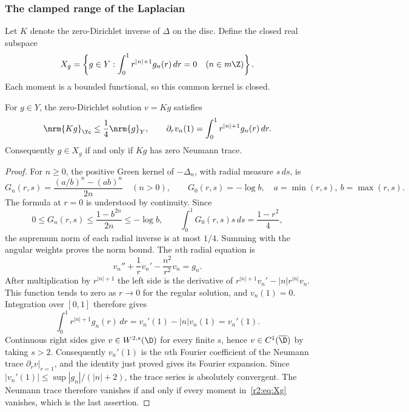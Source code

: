 \subsubsection{The clamped range of the Laplacian}
Let $K$ denote the zero-Dirichlet inverse of $\Delta$ on the disc. Define the closed real subspace
\begin{equation}\label{r2:eq:Xg}
 X_g=\left\{g\in Y:
 \int_0^1 r^{|n|+1}g_n(r)\,dr=0
 \quad(n\in m\Z)\right\}.
\end{equation}
Each moment is a bounded functional, so this common kernel is closed.

\begin{lemma}\label{r2:lem:Poisson}
For $g\in Y$, the zero-Dirichlet solution $v=Kg$ satisfies
\begin{equation}\label{r2:eq:Poisson}
 \nrm{Kg}_{\Yc}\le\frac14\nrm{g}_Y,\qquad
 \partial_rv_n(1)=\int_0^1r^{|n|+1}g_n(r)\,dr.
\end{equation}
Consequently $g\in X_g$ if and only if $Kg$ has zero Neumann trace.
\end{lemma}
\begin{proof}
For $n\ge0$, the positive Green kernel of $-\Delta_n$, with radial measure $s\,ds$, is
\[
 G_n(r,s)=\frac{(a/b)^n-(ab)^n}{2n}\quad(n>0),\qquad
 G_0(r,s)=-\log b,
 \quad a=\min(r,s),\ b=\max(r,s).
\]
The formula at $r=0$ is understood by continuity. Since
\[
 0\le G_n(r,s)\le\frac{1-b^{2n}}{2n}\le-\log b,
 \qquad\int_0^1G_0(r,s)s\,ds=\frac{1-r^2}{4},
\]
the supremum norm of each radial inverse is at most $1/4$. Summing with the angular weights proves the norm bound. The $n$th radial equation is
\[
 v_n''+\frac1r v_n'-\frac{n^2}{r^2}v_n=g_n.
\]
After multiplication by $r^{|n|+1}$ the left side is the derivative of $r^{|n|+1}v_n'-|n|r^{|n|}v_n$. This function tends to zero as $r\to0$ for the regular solution, and $v_n(1)=0$. Integration over $[0,1]$ therefore gives
\[
 \int_0^1r^{|n|+1}g_n(r)\,dr
 =v_n'(1)-|n|v_n(1)=v_n'(1).
\]
Continuous right sides give $v\in W^{2,s}(\D)$ for every finite $s$, hence $v\in C^1(\overline\D)$ by taking $s>2$. Consequently $v_n'(1)$ is the $n$th Fourier coefficient of the Neumann trace $\partial_rv|_{r=1}$, and the identity just proved gives its Fourier expansion. Since $|v_n'(1)|\le\sup|g_n|/(|n|+2)$, the trace series is absolutely convergent. The Neumann trace therefore vanishes if and only if every moment in~\eqref{r2:eq:Xg} vanishes, which is the last assertion.
\end{proof}

